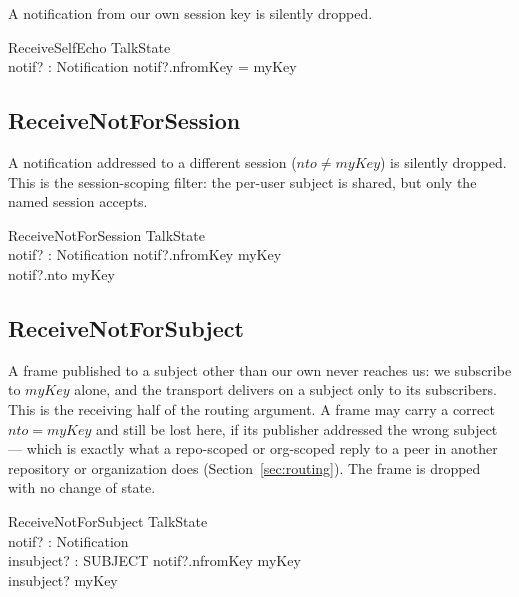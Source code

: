 \documentclass[a4paper,10pt,fleqn]{article}
\begin{document}
A notification from our own session key is silently dropped.

\begin{schema}{ReceiveSelfEcho}
  \Xi TalkState \\
  notif? : Notification
\where
  notif?.nfromKey = myKey
\end{schema}

\subsection{ReceiveNotForSession}

A notification addressed to a different session ($nto \neq myKey$) is
silently dropped.  This is the session-scoping filter: the per-user
subject is shared, but only the named session accepts.

\begin{schema}{ReceiveNotForSession}
  \Xi TalkState \\
  notif? : Notification
\where
  notif?.nfromKey \neq myKey \\
  notif?.nto \neq myKey
\end{schema}

\subsection{ReceiveNotForSubject}

A frame published to a subject other than our own never reaches us: we
subscribe to $myKey$ alone, and the transport delivers on a subject only
to its subscribers.  This is the receiving half of the routing argument.
A frame may carry a correct $nto = myKey$ and still be lost here, if its
publisher addressed the wrong subject --- which is exactly what a
repo-scoped or org-scoped reply to a peer in another repository or
organization does (Section~\ref{sec:routing}).  The frame is dropped with
no change of state.

\begin{schema}{ReceiveNotForSubject}
  \Xi TalkState \\
  notif? : Notification \\
  insubject? : SUBJECT
\where
  notif?.nfromKey \neq myKey \\
  insubject? \neq myKey
\end{schema}
\end{document}
